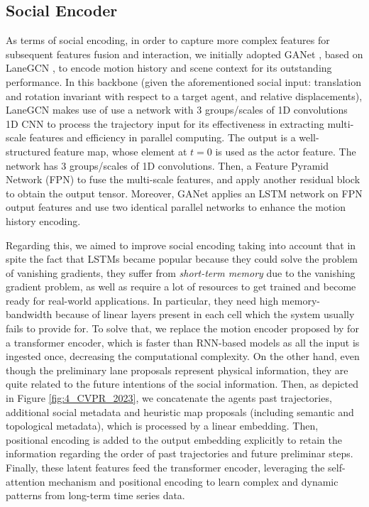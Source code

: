 \subsection{Social Encoder}
\label{subsubsec:4_improving_efficiency_social_encoder}

As terms of social encoding, in order to capture more complex features for subsequent features fusion and interaction, we initially adopted GANet \cite{wang2022ganet}, based on LaneGCN \cite{liang2020learning}, to encode motion history and scene context for its outstanding performance. In this backbone (given the aforementioned social input: translation and rotation invariant with respect to a target agent, and relative displacements), LaneGCN makes use of use a network with $3$ groups/scales of 1D convolutions 1D CNN to process the trajectory input for its effectiveness in extracting multi-scale features and efficiency in parallel computing. The output is a well-structured feature map, whose element at $t=0$ is used as the actor feature. The network has $3$ groups/scales of 1D convolutions. Then, a Feature Pyramid Network (FPN) \cite{lin2017feature} to fuse the multi-scale features, and apply another residual block to obtain the output tensor. Moreover, GANet applies an \ac{LSTM} network on FPN output features and use two identical parallel networks to enhance the motion history encoding.

Regarding this, we aimed to improve social encoding taking into account that in spite the fact that \acp{LSTM} became popular because they could solve the problem of vanishing gradients, they suffer from \textit{short-term memory} due to the vanishing gradient problem, as well as require a lot of resources to get trained and become ready for real-world applications. In particular, they need high memory-bandwidth because of linear layers present in each cell which the system usually fails to provide for. To solve that, we replace the motion encoder proposed by \cite{wang2022ganet} for a transformer encoder, which is faster than \ac{RNN}-based models as all the input is ingested once, decreasing the computational complexity. On the other hand, even though the preliminary lane proposals represent physical information, they are quite related to the future intentions of the social information. Then, as depicted in Figure \ref{fig:4_CVPR_2023}, we concatenate the agents past trajectories, additional social metadata and heuristic map proposals (including semantic and topological metadata), which is processed by a linear embedding. Then, positional encoding is added to the output embedding explicitly to retain the information regarding the order of past trajectories and future preliminar steps. Finally, these latent features feed the transformer encoder, leveraging the self-attention mechanism and positional encoding to learn complex and dynamic patterns from long-term time series data. 

